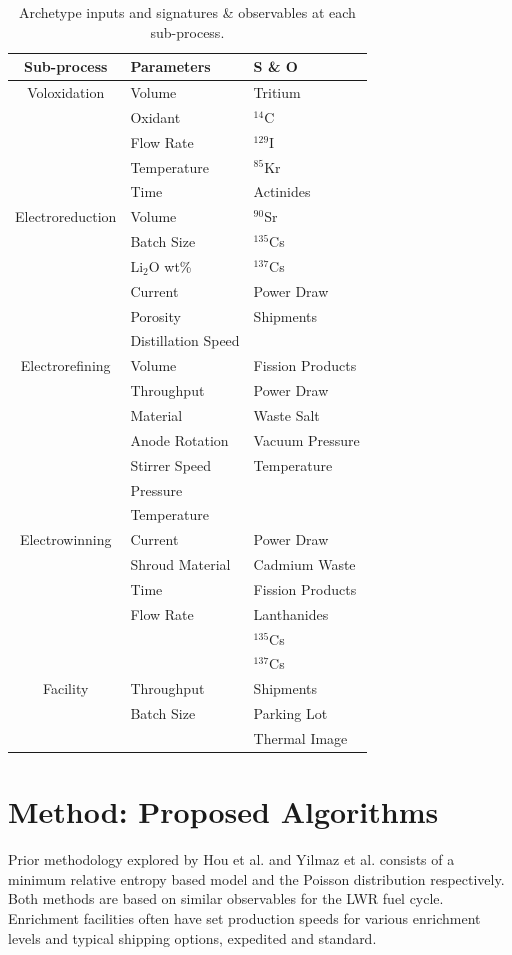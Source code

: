\documentclass{anstrans}
\begin{document}
\begin{table}[h]
	\centering
	\begin{tabularx}{0.5\textwidth}{cll}
		\hline
		\textbf{Sub-process} & \textbf{Parameters} & \textbf{S \& O} \\
		\hline
		Voloxidation & Volume & Tritium \\
		& Oxidant & $^{14}$C \\
		& Flow Rate &  $^{129}$I\\
		& Temperature & $^{85}$Kr \\
		& Time & Actinides\\ \hline
		Electroreduction & Volume & $^{90}$Sr \\
		& Batch Size & $^{135}$Cs \\
		& Li$_2$O wt\% & $^{137}$Cs \\
		& Current & Power Draw \\
		& Porosity & Shipments \\
		& Distillation Speed & \\ \hline
		Electrorefining & Volume & Fission Products\\
		& Throughput & Power Draw \\
		& Material & Waste Salt \\
		& Anode Rotation & Vacuum Pressure\\
		& Stirrer Speed & Temperature \\
		& Pressure & \\
		& Temperature & \\ \hline
		Electrowinning & Current & Power Draw \\
		& Shroud Material & Cadmium Waste \\
		& Time & Fission Products \\
		& Flow Rate & Lanthanides \\
		&  & $^{135}$Cs \\
		&  & $^{137}$Cs \\ \hline
		Facility & Throughput & Shipments \\
		& Batch Size & Parking Lot \\
		& & Thermal Image \\
		\hline
	\end{tabularx}
	\caption {Archetype inputs and signatures \& observables at each sub-process.}
	\label {tab:pressure}
\end{table}

\section{Method: Proposed Algorithms}
Prior methodology explored by Hou et al. and Yilmaz et al. \cite{Hou_2016,Yilmaz_2016} consists of a minimum relative 
entropy based model and the Poisson distribution respectively. Both methods are based on similar observables for the LWR 
fuel cycle. Enrichment facilities often have set production speeds for various enrichment levels and typical shipping 
options, expedited and standard. 
\end{document}

